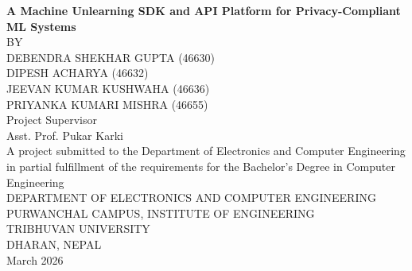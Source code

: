 \begin{titlepage}
\begin{center}

\vspace*{1cm}

{\fontsize{13pt}{16pt}\selectfont \textbf{A Machine Unlearning SDK and API Platform for Privacy-Compliant ML Systems}}\\[1.2cm]

{\fontsize{11pt}{13pt}\selectfont BY}\\[0.5cm]

{\fontsize{11pt}{13pt}\selectfont DEBENDRA SHEKHAR GUPTA (46630)}\\[0.2cm]
{\fontsize{11pt}{13pt}\selectfont DIPESH ACHARYA (46632)}\\[0.2cm]
{\fontsize{11pt}{13pt}\selectfont JEEVAN KUMAR KUSHWAHA (46636)}\\[0.2cm]
{\fontsize{11pt}{13pt}\selectfont PRIYANKA KUMARI MISHRA (46655)}\\[1.2cm]

{\fontsize{11pt}{13pt}\selectfont Project Supervisor}\\[0.2cm]
{\fontsize{11pt}{13pt}\selectfont Asst. Prof. Pukar Karki}\\[1.2cm]

{\fontsize{11pt}{13pt}\selectfont A project submitted to the Department of Electronics and Computer Engineering in partial fulfillment of the requirements for the Bachelor's Degree in Computer Engineering}\\[1.5cm]

{\fontsize{11pt}{13pt}\selectfont DEPARTMENT OF ELECTRONICS AND COMPUTER ENGINEERING}\\[0.2cm]
{\fontsize{11pt}{13pt}\selectfont PURWANCHAL CAMPUS, INSTITUTE OF ENGINEERING}\\[0.2cm]
{\fontsize{11pt}{13pt}\selectfont TRIBHUVAN UNIVERSITY}\\[0.2cm]
{\fontsize{11pt}{13pt}\selectfont DHARAN, NEPAL}\\[0.8cm]

{\fontsize{11pt}{13pt}\selectfont March 2026}

\end{center}
\end{titlepage}
